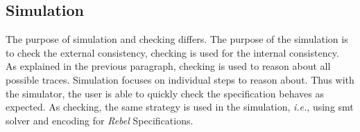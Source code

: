 \subsection{Simulation}
The purpose of simulation and checking differs. The purpose of the simulation is to check the external consistency, checking is used for the internal consistency.~\cite[p.~5]{stoel_storm_vinju_bosman_2016} As explained in the previous paragraph, checking is used to reason about all possible traces. Simulation focuses on individual steps to reason about. Thus with the simulator, the user is able to quickly check the specification behaves as expected. As checking, the same strategy is used in the simulation, \textit{i.e.}, using \gls{smt} solver and encoding for \textit{Rebel} Specifications.
